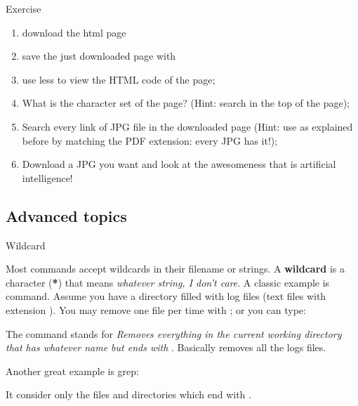 \begin{frame}{Exercise}
	\begin{enumerate}
		\item<1-> download the html page 
		\item<2-> save the just downloaded page with 
		\item<3-> use less to view the HTML code of the page;
		\item<4-> What is the character set of the page? (Hint: search  in the top of the page);
		\item<5-> Search every link of JPG file in the downloaded page (Hint: use  as explained before by matching the PDF extension: every JPG has it!);
		\item<6-> Download a JPG you want and look at the awesomeness that is artificial intelligence!
	\end{enumerate}
\end{frame}

\subsection{Advanced topics}

\begin{frame}{Wildcard}

Most commands accept wildcards in their filename or strings. A \textbf{wildcard} is a character (\textbf{*}) that means  \textit{whatever string, I don't care}. A classic example is  command. Assume you have a directory filled with log files (text files with extension ). You may remove one file per time with ; or you can type:

\begin{center}
\end{center}

The command stands for \textit{Removes everything in the current working directory that has whatever name but ends with }. Basically removes all the logs files.

Another great example is grep:

\begin{center}
\end{center}

It consider only the files and directories which end with .

\end{frame}

